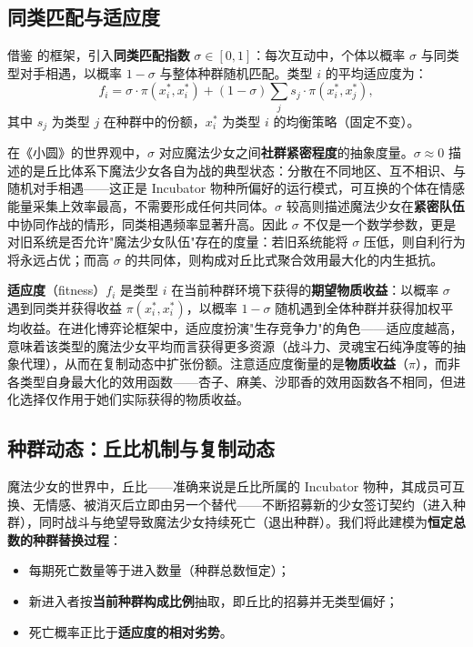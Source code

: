\documentclass[12pt]{article}
\begin{document}
\subsection{同类匹配与适应度}

借鉴 \citet{AlgerWeibull2013} 的框架，引入\textbf{同类匹配指数} $\sigma \in [0,1]$：每次互动中，个体以概率 $\sigma$ 与同类型对手相遇，以概率 $1-\sigma$ 与整体种群随机匹配。类型 $i$ 的平均适应度为：
\begin{equation}
    f_i = \sigma \cdot \pi(x_i^*, x_i^*) + (1-\sigma) \sum_j s_j \cdot \pi(x_i^*, x_j^*),
    \label{eq:fitness}
\end{equation}
其中 $s_j$ 为类型 $j$ 在种群中的份额，$x_i^*$ 为类型 $i$ 的均衡策略（固定不变）。

在《小圆》的世界观中，$\sigma$ 对应魔法少女之间\textbf{社群紧密程度}的抽象度量。$\sigma \approx 0$ 描述的是丘比体系下魔法少女各自为战的典型状态：分散在不同地区、互不相识、与随机对手相遇——这正是 Incubator 物种所偏好的运行模式，可互换的个体在情感能量采集上效率最高，不需要形成任何共同体。$\sigma$ 较高则描述魔法少女在\textbf{紧密队伍}中协同作战的情形，同类相遇频率显著升高。因此 $\sigma$ 不仅是一个数学参数，更是对旧系统是否允许"魔法少女队伍"存在的度量：若旧系统能将 $\sigma$ 压低，则自利行为将永远占优；而高 $\sigma$ 的共同体，则构成对丘比式聚合效用最大化的内生抵抗。

\textbf{适应度}（fitness）$f_i$ 是类型 $i$ 在当前种群环境下获得的\textbf{期望物质收益}：以概率 $\sigma$ 遇到同类并获得收益 $\pi(x_i^*, x_i^*)$，以概率 $1-\sigma$ 随机遇到全体种群并获得加权平均收益。在进化博弈论框架中，适应度扮演"生存竞争力"的角色——适应度越高，意味着该类型的魔法少女平均而言获得更多资源（战斗力、灵魂宝石纯净度等的抽象代理），从而在复制动态中扩张份额。注意适应度衡量的是\textbf{物质收益}（$\pi$），而非各类型自身最大化的效用函数——杏子、麻美、沙耶香的效用函数各不相同，但进化选择仅作用于她们实际获得的物质收益。

\subsection{种群动态：丘比机制与复制动态}

魔法少女的世界中，丘比——准确来说是丘比所属的 Incubator 物种，其成员可互换、无情感、被消灭后立即由另一个替代——不断招募新的少女签订契约（进入种群），同时战斗与绝望导致魔法少女持续死亡（退出种群）。我们将此建模为\textbf{恒定总数的种群替换过程}：

\begin{itemize}
    \item 每期死亡数量等于进入数量（种群总数恒定）；
    \item 新进入者按\textbf{当前种群构成比例}抽取，即丘比的招募并无类型偏好；
    \item 死亡概率正比于\textbf{适应度的相对劣势}。
\end{itemize}
\end{document}
